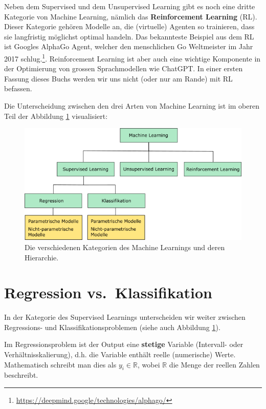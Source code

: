 \documentclass[
]{book}
\begin{document}
Neben dem Supervised und dem Unsupervised Learning gibt es noch eine dritte Kategorie von Machine Learning, nämlich das \textbf{Reinforcement Learning} (RL). Dieser Kategorie gehören Modelle an, die (virtuelle) Agenten so trainieren, dass sie langfristig möglichst optimal handeln. Das bekannteste Beispiel aus dem RL ist Googles AlphaGo Agent, welcher den menschlichen Go Weltmeister im Jahr 2017 schlug.\footnote{\url{https://deepmind.google/technologies/alphago/}}. Reinforcement Learning ist aber auch eine wichtige Komponente in der Optimierung von grossen Sprachmodellen wie ChatGPT. In einer ersten Fassung dieses Buchs werden wir uns nicht (oder nur am Rande) mit RL befassen.

Die Unterscheidung zwischen den drei Arten von Machine Learning ist im oberen Teil der Abbildung \ref{fig:slulrl} visualisiert:

\begin{figure}

{\centering \includegraphics[width=0.9\linewidth]{images/SL_UL_RL} 

}

\caption{Die verschiedenen Kategorien des Machine Learnings und deren Hierarchie. }\label{fig:slulrl}
\end{figure}

\hypertarget{regression-vs.-klassifikation}{%
\section{Regression vs.~Klassifikation}\label{regression-vs.-klassifikation}}

In der Kategorie des Supervised Learnings unterscheiden wir weiter zwischen Regressions- und Klassifikationsproblemen (siehe auch Abbildung \ref{fig:slulrl}).

Im Regressionsproblem ist der Output eine \textbf{stetige} Variable (Intervall- oder Verhältnisskalierung), d.h. die Variable enthält reelle (numerische) Werte. Mathematisch schreibt man dies als \(y_i \in \mathbb{R}\), wobei \(\mathbb{R}\) die Menge der reellen Zahlen beschreibt.
\end{document}

